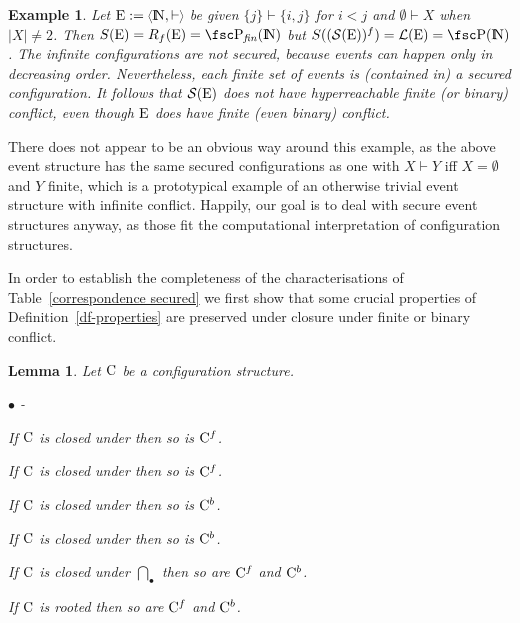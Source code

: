 \documentclass[twocolumn]{article}
\newtheorem{lemm}{Lemma}
\newtheorem{exam}{Example}
\newenvironment{lemma}[1]{\begin{lemm} \rm \label{lem-#1} }{\end{lemm}}
\newenvironment{example}[1]{\begin{exam} \rm \label{ex-#1} }{\end{exam}}
\newcommand{\df}[1]{Definition~\ref{df-#1}}
\newenvironment{itemise}{\begin{list}{$\bullet$}{\leftmargin 18pt
                        \labelwidth\leftmargini\advance\labelwidth-\labelsep
                        \topsep 4pt \itemsep 2pt \parsep 2pt}}{\end{list}}
\newcommand{\turn}{\vdash}                              \newcommand{\dbigcup}{\bigcup_{\uparrow}}		\newcommand{\nbigcup}{\bigcup_{\bullet}}		\newcommand{\nbigcap}{\bigcap_{\bullet}}		\newcommand{\bbigcup}{\overline{\bigcup}}		\newcommand{\bbigcap}{\overline{\bigcap}}		\newcommand{\nbbigcap}{\bbigcap_{\bullet}}		\newcommand{\fbbigcup}{\overline{\bigcup}^f}		\newcommand{\bbbigcup}{\overline{\bigcup}^2}		\newcommand{\dcup}{~~\makebox[0pt]{\LARGE$\cdot$}\makebox[0pt]{$\cup$}~~}
\newcommand{\dl}[1]{\mbox{\rm I\hspace{-0.75mm}#1}}     \newcommand{\dc}[1]{\mbox{\rm {\raisebox{.4ex}{\makebox [0pt][l]{\hspace{.2em}\scriptsize $\mid$}}}#1}}
\newcommand{\IN}{\dl{N}}                        \newcommand{\IQ}{\dc{Q}}                        \newcommand{\IC}{\dc{C}}                        \newcommand{\IE}{\dl{E}}                        \newcommand{\IG}{\dc{G}}                        \newcommand{\fC}{{\cal C}}                      \newcommand{\fE}{{\cal E}}                      \newcommand{\fG}{{\cal G}}                      \newcommand{\fN}{{\cal N}}                      \newcommand{\fF}{{\cal F}}                      \newcommand{\fL}{{\cal L}}                      \newcommand{\fM}{{\cal M}}                      \newcommand{\fS}{{\cal S}}                      \newcommand{\fR}{{\cal R}}                      \newcommand{\eC}{{\rm C}}                       \newcommand{\eD}{{\rm D}}                       \newcommand{\eE}{{\rm E}}                       \newcommand{\eF}{{\rm F}}                       \newcommand{\eG}{{\rm G}}                       \newcommand{\eH}{{\rm H}}                       \newcommand{\eK}{{\rm K}}                       \newcommand{\eL}{{\rm L}}                       \newcommand{\eN}{{\rm N}}                       \newcommand{\eP}{{\rm P}}                       \newcommand{\eM}{{\rm M}}                       \newcommand{\eT}{{\rm T}}                       \newcommand{\fT}{{\cal T}}
\begin{document}
\begin{example}{no hyperreachable conflict}
Let $\eE:=\tuple{\IN,\turn\;}$ be given $\{j\} \turn \{i,j\}$
for $i<j$ and $\emptyset\turn X$ when $|X|\neq 2$. Then
$S(\eE)=R_f(\eE)=\pow_{\it fin}(\IN)$ but
$S((\fS(\eE))^f) = \fL(\eE) = \pow(\IN)$.  The infinite
configurations are not secured, because events can happen only in
decreasing order. Nevertheless, each finite set of events is
(contained in) a secured configuration.  It follows that $\fS(\eE)$
does not have hyperreachable finite (or binary) conflict, even though
$\eE$ does have finite (even binary) conflict.
\end{example}
There does not appear to be an obvious way around this example, as the
above event structure has the same secured configurations as one with
$X\turn Y$ iff $X=\emptyset$ and $Y$ finite, which is a prototypical
example of an otherwise trivial event structure with infinite
conflict. Happily, our goal is to deal with secure
event structures anyway, as those fit the computational interpretation
of configuration structures.

In order to establish the completeness of the characterisations of
Table~\ref{correspondence secured} we first show that some crucial
properties of \df{properties} are preserved under closure under finite
or binary conflict.

\begin{lemma}{closure}
Let $\eC$ be a configuration structure.
\begin{itemise}
\item If $\eC$ is closed under \plat{\bbigcup^f} then so is $\eC^f$.
\item If $\eC$ is closed under \plat{\nbbigcap^f} then so is $\eC^f$.
\item If $\eC$ is closed under \plat{\bbigcup^2} then so is $\eC^b$.
\item If $\eC$ is closed under \plat{\nbbigcap^2} then so is $\eC^b$.
\item If $\eC$ is closed under $\nbigcap$ then so are $\eC^f$ and $\eC^b$.
\item If $\eC$ is rooted then so are $\eC^f$ and $\eC^b$.
\end{itemise}
\end{lemma}
\end{document}
